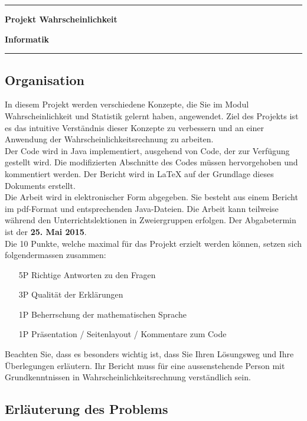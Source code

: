 \documentclass[12pt,a4paper]{article}
\begin{document}
\hrule
{\bfseries\large Projekt Wahrscheinlichkeit} \rule[-1.5ex]{0pt}{5ex}  \hfill {\bfseries\large Informatik}
\hrule
\vspace{5ex}

\subsection*{Organisation} 

In diesem Projekt werden verschiedene Konzepte, die Sie im Modul Wahrscheinlichkeit und Statistik gelernt haben, 
angewendet. Ziel des Projekts ist es das intuitive Verständnis dieser Konzepte zu verbessern und an einer
Anwendung der Wahrscheinlichkeitsrechnung zu arbeiten.\\

Der Code wird in Java implementiert, ausgehend von Code, der zur Verfügung gestellt wird. Die modifizierten Abschnitte des Codes müssen hervorgehoben und kommentiert werden. Der Bericht wird in LaTeX auf der Grundlage dieses Dokuments erstellt.\\

Die Arbeit wird in elektronischer Form abgegeben. Sie besteht aus einem Bericht im pdf-Format und entsprechenden Java-Dateien. Die Arbeit kann teilweise während den Unterrichtslektionen in Zweiergruppen erfolgen. Der
Abgabetermin ist der \textbf{25. Mai 2015}.\\

Die 10 Punkte, welche maximal für das Projekt erzielt werden können, setzen sich folgendermassen 
zusammen:
\begin{enumerate}
\item[5P] Richtige Antworten zu den Fragen
\item[3P] Qualität der Erklärungen
\item[1P] Beherrschung der mathematischen Sprache
\item[1P] Präsentation / Seitenlayout / Kommentare zum Code
\end{enumerate} 

Beachten Sie, dass es besonders wichtig ist, dass Sie Ihren Lösungsweg und Ihre Überlegungen erläutern. 
Ihr Bericht muss für eine aussenstehende Person mit Grundkenntnissen in Wahrscheinlichkeitsrechnung verständlich sein.

\subsection*{Erläuterung des Problems}
\end{document}
